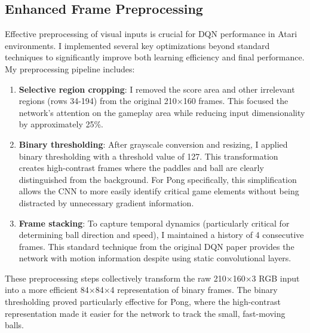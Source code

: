 \documentclass[a4paper]{article}
\begin{document}
\subsection{Enhanced Frame Preprocessing}

Effective preprocessing of visual inputs is crucial for DQN performance in Atari environments. I implemented several key optimizations beyond standard techniques to significantly improve both learning efficiency and final performance. My preprocessing pipeline includes:

\begin{enumerate}
    \item \textbf{Selective region cropping}: I removed the score area and other irrelevant regions (rows 34-194) from the original 210×160 frames. This focused the network's attention on the gameplay area while reducing input dimensionality by approximately 25\%.
    
    \item \textbf{Binary thresholding}: After grayscale conversion and resizing, I applied binary thresholding with a threshold value of 127. This transformation creates high-contrast frames where the paddles and ball are clearly distinguished from the background. For Pong specifically, this simplification allows the CNN to more easily identify critical game elements without being distracted by unnecessary gradient information.
    
    \item \textbf{Frame stacking}: To capture temporal dynamics (particularly critical for determining ball direction and speed), I maintained a history of 4 consecutive frames. This standard technique from the original DQN paper provides the network with motion information despite using static convolutional layers.
\end{enumerate}

These preprocessing steps collectively transform the raw 210×160×3 RGB input into a more efficient 84×84×4 representation of binary frames. The binary thresholding proved particularly effective for Pong, where the high-contrast representation made it easier for the network to track the small, fast-moving balls.
\end{document}
